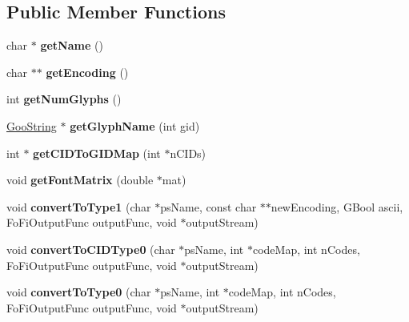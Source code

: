 \subsection*{Public Member Functions}
\begin{DoxyCompactItemize}
\item 
\mbox{\label{class_fo_fi_type1_c_ac1f599b861b9184a262ea0699f3e39df}} 
char $\ast$ {\bfseries get\+Name} ()
\item 
\mbox{\label{class_fo_fi_type1_c_a6e41538f0c7b96f8f85800a760094f45}} 
char $\ast$$\ast$ {\bfseries get\+Encoding} ()
\item 
\mbox{\label{class_fo_fi_type1_c_abd8de5113b91c2ed2ea28099fb4f7caf}} 
int {\bfseries get\+Num\+Glyphs} ()
\item 
\mbox{\label{class_fo_fi_type1_c_aa51c0dbce0da90028acfe233b42def34}} 
\hyperlink{class_goo_string}{Goo\+String} $\ast$ {\bfseries get\+Glyph\+Name} (int gid)
\item 
\mbox{\label{class_fo_fi_type1_c_ae03f83d0df039fb882697c4d2ee60aef}} 
int $\ast$ {\bfseries get\+C\+I\+D\+To\+G\+I\+D\+Map} (int $\ast$n\+C\+I\+Ds)
\item 
\mbox{\label{class_fo_fi_type1_c_a9489d5f464fe5c3b72351ae489b244e9}} 
void {\bfseries get\+Font\+Matrix} (double $\ast$mat)
\item 
\mbox{\label{class_fo_fi_type1_c_a326a1d055cf83e7ec92758d5697a4e34}} 
void {\bfseries convert\+To\+Type1} (char $\ast$ps\+Name, const char $\ast$$\ast$new\+Encoding, G\+Bool ascii, Fo\+Fi\+Output\+Func output\+Func, void $\ast$output\+Stream)
\item 
\mbox{\label{class_fo_fi_type1_c_a32bccd87d5deadad0ca83ef078a68858}} 
void {\bfseries convert\+To\+C\+I\+D\+Type0} (char $\ast$ps\+Name, int $\ast$code\+Map, int n\+Codes, Fo\+Fi\+Output\+Func output\+Func, void $\ast$output\+Stream)
\item 
\mbox{\label{class_fo_fi_type1_c_a05783338a686646deb1b7fc9e4c6a810}} 
void {\bfseries convert\+To\+Type0} (char $\ast$ps\+Name, int $\ast$code\+Map, int n\+Codes, Fo\+Fi\+Output\+Func output\+Func, void $\ast$output\+Stream)
\end{DoxyCompactItemize}
